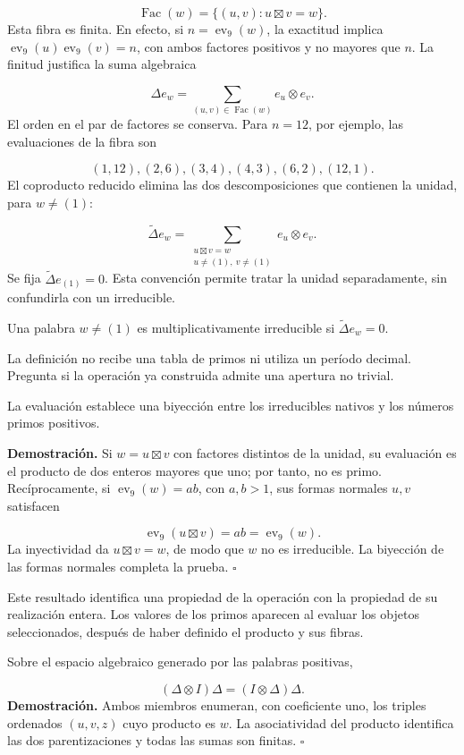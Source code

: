 \[
\operatorname{Fac}(w)=\{(u,v):u\boxtimes v=w\}.
\]
Esta fibra es finita. En efecto, si $n=\operatorname{ev}_9(w)$, la exactitud implica $\operatorname{ev}_9(u)\operatorname{ev}_9(v)=n$, con ambos factores positivos y no mayores que $n$. La finitud justifica la suma algebraica

\[
\Delta e_w=\sum_{(u,v)\in\operatorname{Fac}(w)}e_u\otimes e_v.
\]
El orden en el par de factores se conserva. Para $n=12$, por ejemplo, las evaluaciones de la fibra son

\[
(1,12),(2,6),(3,4),(4,3),(6,2),(12,1).
\]
El coproducto reducido elimina las dos descomposiciones que contienen la unidad, para $w\ne(1)$:

\[
\widetilde\Delta e_w
=\sum_{\substack{u\boxtimes v=w\\u\ne(1),\ v\ne(1)}}e_u\otimes e_v.
\]
Se fija $\widetilde\Delta e_{(1)}=0$. Esta convención permite tratar la unidad separadamente, sin confundirla con un irreducible.

Una palabra $w\ne(1)$ es multiplicativamente irreducible si $\widetilde\Delta e_w=0$.

La definición no recibe una tabla de primos ni utiliza un período decimal. Pregunta si la operación ya construida admite una apertura no trivial.

La evaluación establece una biyección entre los irreducibles nativos y los números primos positivos.

\textbf{Demostración.} Si $w=u\boxtimes v$ con factores distintos de la unidad, su evaluación es el producto de dos enteros mayores que uno; por tanto, no es primo. Recíprocamente, si $\operatorname{ev}_9(w)=ab$, con $a,b>1$, sus formas normales $u,v$ satisfacen

\[
\operatorname{ev}_9(u\boxtimes v)=ab=\operatorname{ev}_9(w).
\]
La inyectividad da $u\boxtimes v=w$, de modo que $w$ no es irreducible. La biyección de las formas normales completa la prueba. \hfill\(\square\)

Este resultado identifica una propiedad de la operación con la propiedad de su realización entera. Los valores de los primos aparecen al evaluar los objetos seleccionados, después de haber definido el producto y sus fibras.

Sobre el espacio algebraico generado por las palabras positivas,

\[
(\Delta\otimes I)\Delta=(I\otimes\Delta)\Delta.
\]
\textbf{Demostración.} Ambos miembros enumeran, con coeficiente uno, los triples ordenados $(u,v,z)$ cuyo producto es $w$. La asociatividad del producto identifica las dos parentizaciones y todas las sumas son finitas. \hfill\(\square\)

